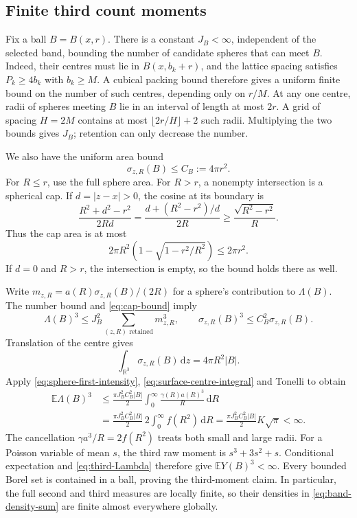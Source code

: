 \documentclass[11pt,a4paper]{article}
\numberwithin{equation}{section}
\theoremstyle{definition}
\theoremstyle{remark}
\newcommand{\R}{\mathbb R}
\newcommand{\E}{\mathbb E}
\newcommand{\dd}{\,\mathrm d}
\begin{document}
\subsection{Finite third count moments}
\label{app:third-moment}

Fix a ball $B=B(x,r)$. There is a constant $J_B<\infty$, independent of the
selected band, bounding the number of candidate spheres that can meet
$B$. Indeed, their centres must lie in $B(x,b_k+r)$, and the lattice
spacing satisfies $P_k\geq4b_k$ with $b_k\geq M$. A cubical packing bound
therefore gives a uniform finite bound on the number of such centres,
depending only on $r/M$. At any one centre, radii of spheres meeting $B$
lie in an interval of length at most $2r$. A grid of spacing $H=2M$
contains at most $\lfloor2r/H\rfloor+2$ such radii. Multiplying the two
bounds gives $J_B$; retention can only decrease the number.

We also have the uniform area bound
\begin{equation}
 \sigma_{z,R}(B)\leq C_B:=4\pi r^2.
 \label{eq:cap-bound}
\end{equation}
For $R\leq r$, use the full sphere area. For $R>r$, a nonempty
intersection is a spherical cap. If $d=|z-x|>0$, the cosine at its boundary
is
\[
 \frac{R^2+d^2-r^2}{2Rd}
 =\frac{d+(R^2-r^2)/d}{2R}
 \geq\frac{\sqrt{R^2-r^2}}{R}.
\]
Thus the cap area is at most
\[
 2\pi R^2\left(1-\sqrt{1-r^2/R^2}\right)\leq2\pi r^2.
\]
If $d=0$ and $R>r$, the intersection is empty, so the bound holds there
as well.

Write $m_{z,R}=a(R)\sigma_{z,R}(B)/(2R)$ for a sphere's contribution to
$\Lambda(B)$. The number bound and \eqref{eq:cap-bound} imply
\[
 \Lambda(B)^3\leq J_B^2\sum_{(z,R)\text{ retained}}m_{z,R}^3,
 \qquad
 \sigma_{z,R}(B)^3\leq C_B^2\sigma_{z,R}(B).
\]
Translation of the centre gives
\begin{equation}
 \int_{\R^3}\sigma_{z,R}(B)\dd z=4\pi R^2|B|.
 \label{eq:surface-centre-integral}
\end{equation}
Apply \eqref{eq:sphere-first-intensity},
\eqref{eq:surface-centre-integral} and Tonelli to obtain
\begin{align}
 \E\Lambda(B)^3
 &\leq\frac{\pi J_B^2C_B^2|B|}{2}
             \int_0^\infty\frac{\gamma(R)a(R)^3}{R}\dd R\nonumber\\
 &=\frac{\pi J_B^2C_B^2|B|}{2}
             \,2\int_0^\infty f(R^2)\dd R
 =\frac{\pi J_B^2C_B^2|B|}{2}K\sqrt\pi<\infty.
 \label{eq:third-Lambda}
\end{align}
The cancellation $\gamma a^3/R=2f(R^2)$ treats both small and large
radii. For a Poisson variable of mean $s$, the third raw moment is
$s^3+3s^2+s$. Conditional expectation and
\eqref{eq:third-Lambda} therefore give $\E Y(B)^3<\infty$.
Every bounded Borel set is contained in a ball, proving the third-moment
claim. In particular, the full second and third measures are locally
finite, so their densities in \eqref{eq:band-density-sum} are finite
almost everywhere globally.
\end{document}

